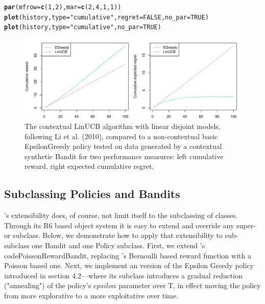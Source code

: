\documentclass{jss}\usepackage[]{graphicx}\usepackage[]{color}
\makeatletter
\def\maxwidth{ %
  \ifdim\Gin@nat@width>\linewidth
    \linewidth
  \else
    \Gin@nat@width
  \fi
}
\newcommand{\hlnum}[1]{\textcolor[rgb]{0.686,0.059,0.569}{#1}}%
\newcommand{\hlstr}[1]{\textcolor[rgb]{0.192,0.494,0.8}{#1}}%
\newcommand{\hlstd}[1]{\textcolor[rgb]{0.345,0.345,0.345}{#1}}%
\newcommand{\hlkwc}[1]{\textcolor[rgb]{0.333,0.667,0.333}{#1}}%
\newcommand{\hlkwd}[1]{\textcolor[rgb]{0.737,0.353,0.396}{\textbf{#1}}}%
\newenvironment{kframe}{%
 \def\at@end@of@kframe{}%
 \ifinner\ifhmode%
  \def\at@end@of@kframe{\end{minipage}}%
  \begin{minipage}{\columnwidth}%
 \fi\fi%
 \def\FrameCommand##1{\hskip\@totalleftmargin \hskip-\fboxsep
 \colorbox{shadecolor}{##1}\hskip-\fboxsep
     \hskip-\linewidth \hskip-\@totalleftmargin \hskip\columnwidth}%
 \MakeFramed {\advance\hsize-\width
   \@totalleftmargin\z@ \linewidth\hsize
   \@setminipage}}%
 {\par\unskip\endMakeFramed%
 \at@end@of@kframe}
\newenvironment{knitrout}{}{} %
\makeatother
\begin{document}
\begin{knitrout}
\begin{kframe}
\begin{alltt}
\hlkwd{par}\hlstd{(}\hlkwc{mfrow} \hlstd{=} \hlkwd{c}\hlstd{(}\hlnum{1}\hlstd{,} \hlnum{2}\hlstd{),} \hlkwc{mar} \hlstd{=} \hlkwd{c}\hlstd{(}\hlnum{2}\hlstd{,}\hlnum{4}\hlstd{,}\hlnum{1}\hlstd{,}\hlnum{1}\hlstd{))}
\hlkwd{plot}\hlstd{(history,} \hlkwc{type} \hlstd{=} \hlstr{"cumulative"}\hlstd{,} \hlkwc{regret} \hlstd{=} \hlnum{FALSE}\hlstd{,} \hlkwc{no_par} \hlstd{=} \hlnum{TRUE}\hlstd{)}
\hlkwd{plot}\hlstd{(history,} \hlkwc{type} \hlstd{=} \hlstr{"cumulative"}\hlstd{,} \hlkwc{no_par} \hlstd{=} \hlnum{TRUE}\hlstd{)}
\end{alltt}
\end{kframe}
\end{knitrout}
\begin{center}
\begin{knitrout}
\color{fgcolor}\begin{figure}[H]
\includegraphics[width=\maxwidth,]{fig/lucbpolicy-1} \caption[The contextual LinUCB algorithm with linear disjoint models, following Li et al]{The contextual LinUCB algorithm with linear disjoint models, following Li et al. (2010), compared to a non-contextual basic EpsilonGreedy policy tested on data generated by a contextual synthetic Bandit for two performance measures: left cumulative reward, right expected cumulative regret. }\label{fig:lucbpolicy}
\end{figure}


\end{knitrout}
\end{center}

\subsection{Subclassing Policies and Bandits}

's extensibility does, of course, not limit itself to the subclassing of  classes. Through its R6 based object system it is easy to extend and override any  super- or subclass. Below, we demonstrate how to apply that extensibility to sub-subclass one Bandit and one Policy subclass.
First, we extend 's code{PoissonRewardBandit}, replacing 's Bernoulli based reward function with a Poisson based one. Next, we implement an  version of the Epsilon Greedy policy introduced in section 4.2---where its  subclass introduces a gradual reduction ("annealing") of the policy's $epsilon$ parameter over T, in effect moving the policy from more explorative to a more exploitative over time.
\end{document}
